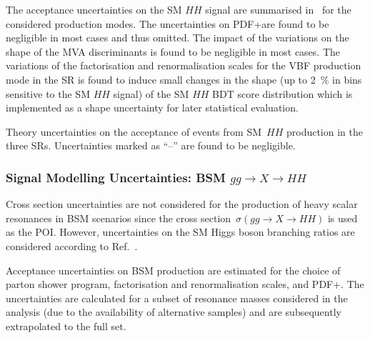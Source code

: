 The acceptance uncertainties on the SM $HH$ signal are summarised
in~ for the considered production modes. The
uncertainties on PDF+\alphas are found to be negligible in most cases and thus
omitted. The impact of the variations on the shape of the MVA discriminants is
found to be negligible in most cases. The variations of the factorisation and
renormalisation scales for the VBF production mode in the \hadhad SR is found to
induce small changes in the shape (up to \SI{2}{\percent} in bins sensitive to
the SM $HH$ signal) of the SM $HH$ BDT score distribution which is implemented
as a shape uncertainty for later statistical evaluation.

\begin{table}[htbp]
  \centering

  \caption{Theory uncertainties on the acceptance of events from SM~$HH$
    production in the three SRs. Uncertainties marked as ``--'' are
    found to be negligible.}%
  \label{tab:theory_uncertainty_signal}

  
\end{table}


\subsubsection{Signal Modelling Uncertainties: BSM $gg \to X \to HH$}

Cross section uncertainties are not considered for the production of heavy
scalar resonances in BSM scenarios since the cross
section~$\sigma(gg \to X \to HH)$ is used as the POI. However, uncertainties on
the SM Higgs boson branching ratios are considered according to
Ref.~\cite{deFlorian:2016spz}.

Acceptance uncertainties on BSM \HH production are estimated for the choice of
parton shower program, factorisation and renormalisation scales, and
PDF+\alphas. The uncertainties are calculated for a subset of resonance masses
considered in the analysis (due to the availability of alternative samples) and
are subsequently extrapolated to the full set.

